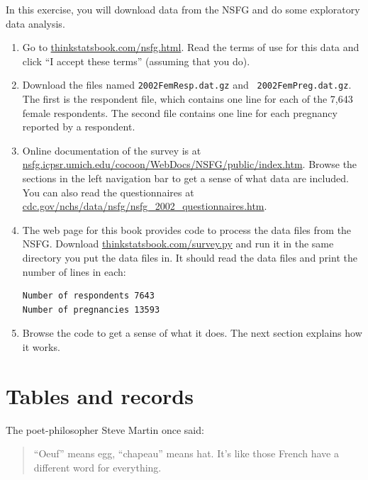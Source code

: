 \documentclass[12pt]{book}
\begin{document}
\begin{ex}

In this exercise, you will download data from the NSFG and do some
exploratory data analysis.

\begin{enumerate}

\item Go to \url{thinkstatsbook.com/nsfg.html}.  Read the terms of
use for this data and click ``I accept these terms'' (assuming that you do).

\item Download the files named {\tt 2002FemResp.dat.gz} and {\tt
  2002FemPreg.dat.gz}.  The first is the respondent file, which contains
  one line for each of the 7,643 female respondents.
  The second file contains one line for each pregnancy reported by a
  respondent.

\item Online documentation of the survey is at
  \url{nsfg.icpsr.umich.edu/cocoon/WebDocs/NSFG/public/index.htm}.
  Browse the sections in the left navigation bar to get a sense of
  what data are included.  You can also read the questionnaires
  at \url{cdc.gov/nchs/data/nsfg/nsfg_2002_questionnaires.htm}.

\item The web page for this book provides code to process the data
  files from the NSFG.  Download \url{thinkstatsbook.com/survey.py}
  and run it in the same directory you put the data files in.  It
  should read the data files and print the number of lines in each:

\begin{verbatim}
Number of respondents 7643
Number of pregnancies 13593
\end{verbatim}

\item Browse the code to get a sense of what it does.  The next
section explains how it works.

\end{enumerate}

\end{ex}

\section{Tables and records}

The poet-philosopher Steve Martin once said:

\begin{quote}
``Oeuf'' means egg, ``chapeau'' means hat.  It's like those French
  have a different word for everything.
\end{quote}
\end{document}
